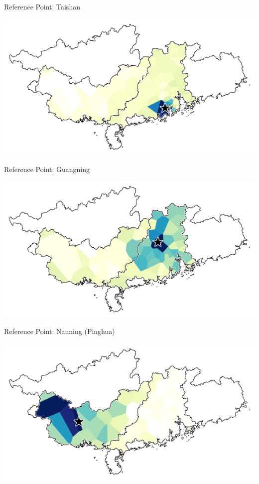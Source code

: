 \documentclass[presentation]{beamer}
\begin{document}
\begin{frame}[label={sec:org16e097f}]{Reference Point: Taishan}
\begin{center}
\includegraphics[width=.9\linewidth]{curmap_ts.png}
\end{center}
\end{frame}
\begin{frame}[label={sec:org5c66c81}]{Reference Point: Guangning}
\begin{center}
\includegraphics[width=.9\linewidth]{curmap_gn.png}
\end{center}
\end{frame}
\begin{frame}[label={sec:org1057082}]{Reference Point: Nanning (Pinghua)}
\begin{center}
\includegraphics[width=.9\linewidth]{curmap_nn_p.png}
\end{center}
\end{frame}
\end{document}

